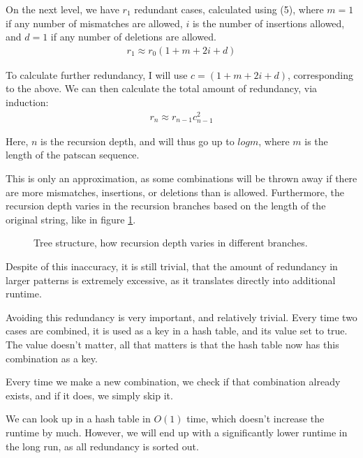 \documentclass[12pt]{article}
\theoremstyle{definition}
\begin{document}
On the next level, we have $r_1$ redundant cases, calculated using (5), where $m=1$ if any number of mismatches are allowed, $i$ is the number of insertions allowed, and $d=1$ if any number of deletions are allowed.
\begin{eqnarray}
	r_1 \approx r_0(1 + m + 2i + d)
\end{eqnarray}

To calculate further redundancy, I will use $c = (1 + m + 2i + d)$, corresponding to the above. We can then calculate the total amount of redundancy, via induction:
\begin{eqnarray}
	r_n \approx r_{n-1}c_{n-1}^2
\end{eqnarray}

Here, $n$ is the recursion depth, and will thus go up to $logm$, where $m$ is the length of the patscan sequence.

This is only an approximation, as some combinations will be thrown away if there are more mismatches, insertions, or deletions than is allowed. Furthermore, the recursion depth varies in the recursion branches based on the length of the original string, like in figure \ref{fig:recursion_depth_example}.

\begin{figure}[H]
	\centering
	\caption{Tree structure, how recursion depth varies in different branches.}
	\label{fig:recursion_depth_example}
\end{figure}

Despite of this inaccuracy, it is still trivial, that the amount of redundancy in larger patterns is extremely excessive, as it translates directly into additional runtime.

Avoiding this redundancy is very important, and relatively trivial. Every time two cases are combined, it is used as a key in a hash table, and its value set to true. The value doesn't matter, all that matters is that the hash table now has this combination as a key.

Every time we make a new combination, we check if that combination already exists, and if it does, we simply skip it.

We can look up in a hash table in $O(1)$ time, which doesn't increase the runtime by much. However, we will end up with a significantly lower runtime in the long run, as all redundancy is sorted out.
\end{document}
